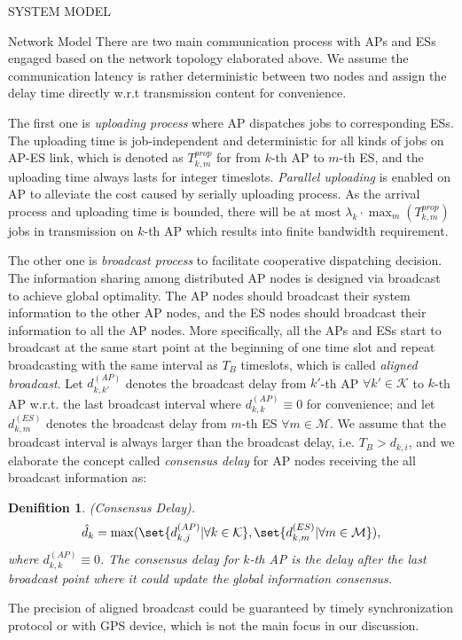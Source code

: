 \documentclass[10pt, conference, letterpaper]{IEEEtran}
\newtheorem{definition}{Denifition}
\DeclarePairedDelimiter\set\{\}
\newcommand{\apSet}{\mathcal{K}}
\newcommand{\esSet}{\mathcal{M}}
\begin{document}
\begin{section}{SYSTEM MODEL}
\begin{subsection}{Network Model}
            There are two main communication process with APs and ESs engaged based on the network topology elaborated above. We assume the communication latency is rather deterministic between two nodes and assign the delay time directly w.r.t transmission content for convenience.

            The first one is \emph{uploading process} where AP dispatches jobs to corresponding ESs. The uploading time is {\color{red}job-independent} and deterministic for all kinds of jobs on AP-ES link, which is denoted as $T^{prop}_{k,m}$ for from $k$-th AP to $m$-th ES, and the uploading time always lasts for integer timeslots. \emph{Parallel uploading} is enabled on AP to alleviate the cost caused by serially uploading process. As the arrival process and uploading time is bounded, there will be at most $\lambda_k \cdot \max_m(T^{prop}_{k,m})$ jobs in transmission on $k$-th AP which results into finite bandwidth requirement.
            
            The other one is \emph{broadcast process} to facilitate cooperative dispatching decision.
            The information sharing among distributed AP nodes is designed via broadcast to achieve global optimality. The AP nodes should broadcast their system information to the other AP nodes, and the ES nodes should broadcast their information to all the AP nodes. More specifically, all the APs and ESs start to broadcast at the same start point at the beginning of one time slot and repeat broadcasting with the same interval as $T_B$ timeslots, which is called \emph{aligned broadcast}.
            Let $d^{(AP)}_{k,k'}$ denotes the broadcast delay from $k'$-th AP $\forall k'\in\apSet$ to $k$-th AP w.r.t. the last broadcast interval where $d^{(AP)}_{k,k} \equiv 0$ for convenience; and let $d^{(ES)}_{k,m}$ denotes the broadcast delay from $m$-th ES $\forall m\in\esSet$. We assume that the broadcast interval is always larger than the broadcast delay, i.e. $T_B > d_{k,i}$, and we elaborate the concept called \emph{consensus delay} for AP nodes receiving the all broadcast information as:
            \begin{definition}
                (Consensus Delay).
                \begin{align}
                    \hat{d}_k = \max(\set{d^{(AP)}_{k,j}|\forall k\in\apSet}, \set{d^{(ES)}_{k,m}|\forall m\in\esSet}),
                \end{align}
                where $d^{(AP)}_{k,k} \equiv 0$. The consensus delay for $k$-th AP is the delay after the last broadcast point where it could update the global information consensus.
            \end{definition}
            The precision of aligned broadcast could be guaranteed by timely synchronization protocol or with GPS device, which is not the main focus in our discussion.
        \end{subsection}


\end{section}
\end{document}
